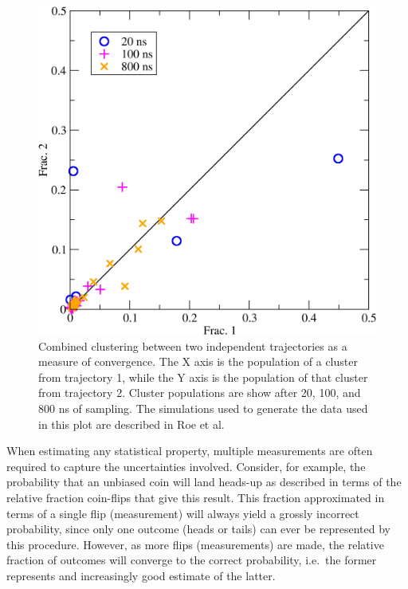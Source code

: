 \begin{figure}
  \centering
  \includegraphics[width=0.9\linewidth]{figures/combinedcluster}
  \caption{Combined clustering between two independent trajectories as a measure of convergence. The X axis is the population of a cluster from trajectory 1, while the Y axis is the population of that cluster from trajectory 2. Cluster populations are show after 20, 100, and 800 ns of sampling. The simulations used to generate the data used in this plot are described in Roe et al.\citep{Roe2014}}
  \label{f:combinedcluster} 
\end{figure}

When estimating any statistical property, multiple measurements are often required to capture the uncertainties involved. Consider, for example, the probability that an unbiased coin will land heads-up as described in terms of the relative fraction coin-flips that give this result.  This fraction approximated in terms of a single flip (measurement) will always yield a grossly incorrect probability, since only one outcome (heads or tails) can ever be represented by this procedure.  However, as more flips (measurements) are made, the relative fraction of outcomes will converge to the correct probability, i.e.\ the former represents and increasingly good estimate of the latter.  

